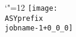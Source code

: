 \setlength{\unitlength}{1pt}
\makeatletter%
\let\ASYencoding\f@encoding%
\let\ASYfamily\f@family%
\let\ASYseries\f@series%
\let\ASYshape\f@shape%
\makeatother%
{\catcode`"=12%
\texttt{[image: \\ASYprefix\\jobname-1+0\_0\_0]}%
}%

